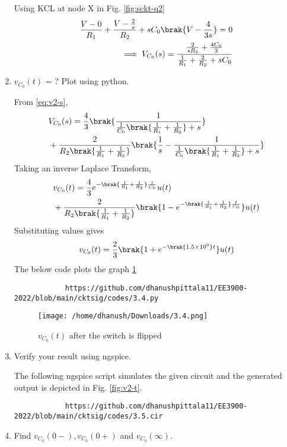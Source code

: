 \documentclass[journal,12pt,twocolumn]{IEEEtran}
\renewcommand\thesection{\arabic{section}}
\begin{document}
\begin{enumerate}[label=\arabic*.,ref=\thesection.\theenumi]
		\solution Using KCL at node X in Fig. \ref{fig:sckt-q2}
		\begin{align}
			\frac{V - 0}{R_1} + \frac{V - \frac{2}{s}}{R_2} + sC_0\brak{V - \frac{4}{3s}} = 0 \\
			\implies V_{C_0}(s) = \frac{\frac{2}{sR_2} + \frac{4C_0}{3}}{\frac{1}{R_1} + \frac{2}{R_2} + sC_0}
			\label{eq:v2-s}
		\end{align}
		\item $v_{C_0}(t)$ = ? Plot using python.
		
		\solution From \eqref{eq:v2-s},
		\begin{align}
			&V_{C_0}(s) = \frac{4}{3}\brak{\frac{1}{\frac{1}{C_0}\brak{\frac{1}{R_1} + \frac{1}{R_2}}+s}} \nonumber \\
			&+ \frac{2}{R_2\brak{\frac{1}{R_1} +\frac{1}{R_2}}}\brak{\frac{1}{s} - \frac{1}{\frac{1}{C_0}\brak{\frac{1}{R_1} + \frac{1}{R_2}} + s}}
		\end{align}
		Taking an inverse Laplace Transform,
		\begin{align}
			&v_{C_0}(t) = \frac{4}{3}e^{-\brak{\frac{1}{R_1} + \frac{1}{R_2}}\frac{t}{C_0}}u(t) \nonumber \\ 
			&+ \frac{2}{R_2\brak{\frac{1}{R_1}+\frac{1}{R_2}}}\brak{1 - e^{-\brak{\frac{1}{R_1} + \frac{1}{R_2}}\frac{t}{C_0}}}u(t)
		\end{align}
		Substituting values gives
		\begin{align}
			v_{C_0}(t) = \frac{2}{3}\brak{1 +e^{-\brak{1.5 \times 10^6}t}}u(t)
			\label{eq:v2-t}
		\end{align}
		The below code plots the graph \ref{fig:v2-t}
		\begin{lstlisting}
			https://github.com/dhanushpittala11/EE3900-2022/blob/main/cktsig/codes/3.4.py
		\end{lstlisting}
		\begin{figure}[!htb]
			\texttt{[image: /home/dhanush/Downloads/3.4.png]}
			\caption{$v_{C_0}(t)$ after the switch is flipped}
			\label{fig:v2-t}
		\end{figure}
		\item Verify your result using ngspice.
		
		\solution The following ngspice script simulates the given circuit and the generated output is depicted in Fig. \eqref{fig:v2-t}.
		\begin{lstlisting}
			https://github.com/dhanushpittala11/EE3900-2022/blob/main/cktsig/codes/3.5.cir
		\end{lstlisting}
		\item Find $v_{C_0}(0-), v_{C_0}(0+)$ and  $v_{C_0}(\infty) $. 
		

\end{enumerate}
\end{document}

